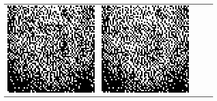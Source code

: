 \begin{figure}
\begin{tabular}{c c c c c}
		\includegraphics[width=\tilewidth,interpolate=false]{media/chp2/associative_memory/hopfield/06_03_activation_scaled_crushed.png}&%
		\includegraphics[width=\tilewidth,interpolate=false]{media/chp2/associative_memory/hopfield/06_04_activation_scaled_crushed.png}\\%

\end{tabular}
\end{figure}
